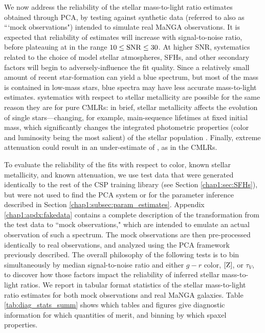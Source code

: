 We now address the reliability of the stellar mass-to-light ratio estimates obtained through PCA, by testing against synthetic data (referred to also as ```mock observations") intended to simulate real MaNGA observations. It is expected that reliability of  estimates will increase with signal-to-noise ratio, before plateauing at in the range $10 \le \rm{SNR} \le 30$. At higher SNR, systematics related to the choice of model stellar atmospheres, SFHs, and other secondary factors will begin to adversely-influence the fit quality. Since a relatively small amount of recent star-formation can yield a blue spectrum, but most of the mass is contained in low-mass stars, blue spectra may have less accurate mass-to-light estimates.  systematics with respect to stellar metallicity are possible for the same reason they are for pure CMLRs: in brief, stellar metallicity affects the evolution of single stars---changing, for example, main-sequence lifetimes at fixed initial mass, which significantly changes the integrated photometric properties (color and luminosity being the most salient) of the stellar population \citep[see][and related MESA/MIST works for a more thorough review]{choi_16_mist}. Finally, extreme attenuation could result in an under-estimate of , as in the CMLRs.

To evaluate the reliability of the  fits with respect to color, known stellar metallicity, and known attenuation, we use test data that were generated identically to the rest of the CSP training library (see Section \ref{chap1:sec:SFHs}), but were not used to find the PCA system or for the parameter inference described in Section \ref{chap1:subsec:param_estimates}. Appendix \ref{chap1:apdx:fakedata} contains a complete description of the transformation from the test data to ``mock observations," which are intended to emulate an actual observation of such a spectrum. The mock observations are then pre-processed identically to real observations, and analyzed using the PCA framework previously described. The overall philosophy of the following tests is to bin simultaneously by median signal-to-noise ratio and either $g-r$ color, ${\rm [Z]}$, or $\tau_V$, to discover how those factors impact the reliability of inferred stellar mass-to-light ratios. We report in tabular format statistics of the stellar mass-to-light ratio estimates for both mock observations and real MaNGA galaxies. Table \ref{tab:diag_stats_summ} shows which tables and figures give diagnostic information for which quantities of merit, and binning by which spaxel properties.

